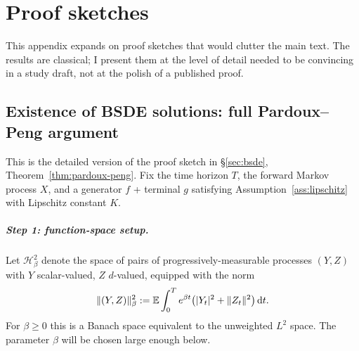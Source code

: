 \chapter{Proof sketches}
\label{app:proofs}

This appendix expands on proof sketches that would clutter the main text. The results are classical; I present them at the level of detail needed to be convincing in a study draft, not at the polish of a published proof.

\section{Existence of BSDE solutions: full Pardoux--Peng argument}
\label{app:pardoux-peng-full}

This is the detailed version of the proof sketch in \S\ref{sec:bsde}, Theorem~\ref{thm:pardoux-peng}. Fix the time horizon $T$, the forward Markov process $X$, and a generator $f$ + terminal $g$ satisfying Assumption~\ref{ass:lipschitz} with Lipschitz constant $K$.

\paragraph{Step 1: function-space setup.}  Let $\mathcal{H}^2_\beta$ denote the space of pairs of progressively-measurable processes $(Y, Z)$ with $Y$ scalar-valued, $Z$ $d$-valued, equipped with the norm
\begin{equation}
  \|(Y, Z)\|_\beta^2 := \mathbb{E}\int_0^T e^{\beta t}\bigl(|Y_t|^2 + \|Z_t\|^2\bigr) \, \mathrm{d} t.
\end{equation}
For $\beta \geq 0$ this is a Banach space equivalent to the unweighted $L^2$ space. The parameter $\beta$ will be chosen large enough below.

